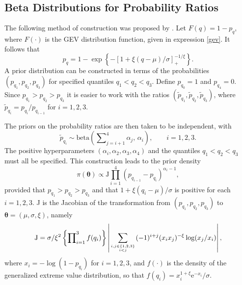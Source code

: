 \documentclass[11pt,a4paper]{article}
\newcommand{\bs}{\boldsymbol}
\newcommand{\sfrac}[2]{\genfrac{}{}{0pt}{}{#1}{#2}}
\begin{document}
\subsection{Beta Distributions for Probability Ratios}
\label{spriorbeta}

The following method of construction was proposed by \citet{crow92}.
Let $F(q) = 1-p_q$, where $F(\cdot)$ is the GEV distribution function,
given in expression \eqref{gev}. It follows that
\begin{equation*}
  p_q = 1 - \exp \left\{ - \left[ 1+ \xi \left( q-\mu \right) /\sigma
    \right]_{+}^{-1/\xi} \right\}. 
\end{equation*}
A prior distribution can be constructed in terms of the probabilities
$(p_{q_1},p_{q_2},p_{q_3})$ for specified quantiles $q_1 < q_2 < q_3$.
Define $p_{q_0} = 1$ and $p_{q_4} = 0$.  Since $p_{q_1} > p_{q_2} >
p_{q_3}$ it is easier to work with the ratios
$(\tilde{p}_{q_1},\tilde{p}_{q_2},\tilde{p}_{q_3})$, where
$\tilde{p}_{q_i} = p_{q_i}/p_{q_{i-1}}$ for $i=1,2,3$.

The priors on the probability ratios are then taken to be independent,
with
\begin{equation*}
  \tilde{p}_{q_i} \sim \text{beta}\left(\sum\nolimits_{j=i+1}^4
    \alpha_j,\,\alpha_i\right), \qquad i=1,2,3. 
\end{equation*}
The positive hyperparameters $(\alpha_i,\alpha_2,\alpha_3,\alpha_4)$
and the quantiles $q_1 < q_2 < q_3$ must all be specified.  This
construction leads to the prior density
\begin{equation}
\pi(\bs{\theta}) \propto \text{J}
\prod_{i=1}^{4} (p_{q_{i-1}} - p_{q_i})^{\alpha_i - 1},
\label{priorbeta}
\end{equation}
provided that $p_{q_1} > p_{q_2} > p_{q_3}$ and that $1+ \xi(
q_i-\mu)/\sigma$ is positive for each $i=1,2,3$.  J is the Jacobian of
the transformation from $(p_{q_1},p_{q_2},p_{q_3})$ to
$\bs{\theta}=(\mu,\sigma,\xi)$, namely
\begin{equation*}
  \text{J} = \sigma/\xi^2  \left\{ \prod\nolimits_{i=1}^3 f(q_i)
  \right\} \left| \sum_{\sfrac{i,j \in \{1,2,3\}}{i < j}} (-1)^{i+j}
    (x_ix_j)^{-\xi} \log (x_j/x_i) \right|, 
\end{equation*}
where $x_i = -\log(1 - p_{q_i})$ for $i=1,2,3$, and $f(\cdot)$ is the
density of the generalized extreme value distribution, so that $f(q_i)
= x_i^{1+\xi}\text{e}^{-x_i}/\sigma$.
\end{document}
